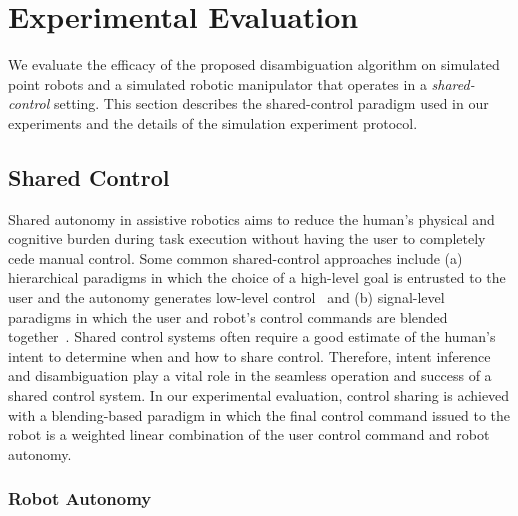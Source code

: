 \documentclass[conference]{IEEEtran}
\begin{document}
\section{Experimental Evaluation}\label{sec:ed}
We evaluate the efficacy of the proposed disambiguation algorithm on simulated point robots and a simulated robotic manipulator that operates in a \textit{shared-control} setting. This section describes the shared-control paradigm used in our experiments and the details of the simulation experiment protocol.
\subsection{Shared Control}\label{ssec:shared-control}
Shared autonomy in assistive robotics aims to reduce the human's physical and cognitive burden during task execution without having the user to completely cede manual control. Some common shared-control approaches include (a) hierarchical paradigms in which the choice of a high-level goal is entrusted to the user and the autonomy generates low-level control~\citep{kim2012autonomy} and (b) signal-level paradigms in which the user and robot's control commands are blended together~\citep{muelling2017autonomy}. Shared control systems often require a good estimate of the human's intent to determine when and how to share control. Therefore, intent inference and disambiguation play a vital role in the seamless operation and success of a shared control system. In our experimental evaluation, control sharing is achieved with a blending-based paradigm in which the final control command issued to the robot is a weighted linear combination of the user control command and robot autonomy.
\subsubsection{Robot Autonomy}\label{sssec:autonomy}
\end{document}
